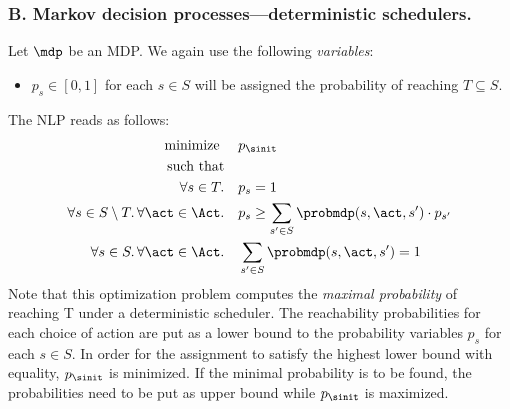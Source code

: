 \subsubsection{B. Markov decision processes---deterministic schedulers.}
Let $\mdp$ be an MDP. We again use the following \emph{variables}:
		\begin{itemize}
			\item $p_s\in[0,1]$ for each $s\in S$ will be assigned the probability of reaching $T\subseteq S$.
		\end{itemize}
	 	The NLP reads as follows:
		\begin{align}
			\text{minimize } &\quad p_{\sinit}\label{eq:min_mdp}\\
			\text{such that}\\
			\forall s\in T.	 &\quad p_s=1\label{eq:targetprob_mdp}\\
			\forall s\in S\setminus T.\,\forall \act\in\Act.	&\quad p_s \geq \sum_{s'\in S}	\probmdp(s,\act,s')\cdot p_{s'}\label{eq:probcomputation_mdp}\\
			\forall s\in S.\, \forall\act\in\Act.	 &\quad \sum_{s'\in S}\probmdp(s,\act,s')=1\label{eq:well-defined_probs_mdp}
		\end{align}
Note that this optimization problem computes the \emph{maximal probability} of reaching T under a deterministic scheduler. The reachability probabilities for each choice of action are put as a lower bound to the probability variables $p_s$ for each $s\in S$. In order for the assignment to satisfy the highest lower bound with equality, $p_{\sinit}$ is minimized. If the minimal probability is to be found, the probabilities need to be put as upper bound while $p_{\sinit}$ is maximized.

